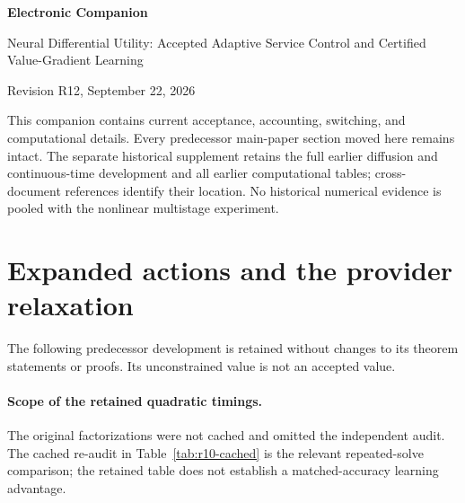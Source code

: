 \documentclass[11pt,letterpaper]{article}
\theoremstyle{definition}
\newcommand{\1}{\mathbf 1}
\begin{document}
\begin{center}{\Large\bfseries Electronic Companion\par}\medskip
{\large Neural Differential Utility: Accepted Adaptive Service Control and Certified Value-Gradient Learning\par}\medskip
Revision R12, September 22, 2026
\end{center}
This companion contains current acceptance, accounting, switching, and computational details. Every predecessor main-paper section moved here remains intact. The separate historical supplement retains the full earlier diffusion and continuous-time development and all earlier computational tables; cross-document references identify their location. No historical numerical evidence is pooled with the nonlinear multistage experiment.









\section{Expanded actions and the provider relaxation}\label{ec:r12-provider}
The following predecessor development is retained without changes to its theorem statements or proofs. Its unconstrained value is not an accepted value.




\paragraph{Scope of the retained quadratic timings.}
The original factorizations were not cached and omitted the independent audit. The cached re-audit in Table~\ref{tab:r10-cached} is the relevant repeated-solve comparison; the retained table does not establish a matched-accuracy learning advantage.




\clearpage
\end{document}
